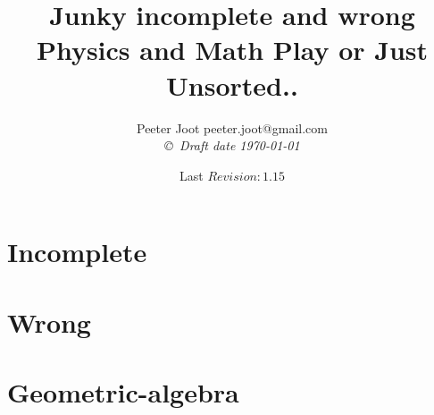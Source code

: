 \documentclass[12pt,leqno]{book}
\date{ Last $Revision: 1.15 $ }
\begin{document}

\title{Junky incomplete and wrong Physics and Math Play or Just Unsorted..}
\author{Peeter Joot  \quad peeter.joot@gmail.com \\
{\small\em \copyright \  Draft date \today }}

\maketitle

\clearpage{}
\tableofcontents

\clearpage{}

\pagestyle{plain}




\part{Incomplete}



%
%
%










%
%
%
%
%

\part{Wrong}

%


\part{Geometric-algebra}






\end{document}
